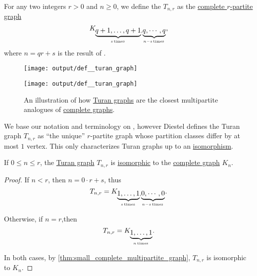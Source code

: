 \begin{definition}\label{def:turan_graph}\mimprovised
  For any two integers \( r > 0 \) and \( n \geq 0 \), we define the  \( T_{n,r} \) as the \hyperref[def:complete_multipartite_graph]{complete \( r \)-partite graph}
  \begin{equation*}
    K_{\underbrace{q+1,\ldots,q+1}_{s \T*{times}},\underbrace{q,\cdots,q}_{n - s \T*{times}}},
  \end{equation*}
  where \( n = qr + s \) is the result of .

  \begin{figure}[!ht]
    \begin{subcaptionblock}{0.45\textwidth}
      \centering
      \texttt{[image: output/def\_\_turan\_graph]}
      \caption{\( K_5 \)}\label{fig:def:turan_graph/k5}
    \end{subcaptionblock}
    \hfill
    \begin{subcaptionblock}{0.45\textwidth}
      \centering
      \texttt{[image: output/def\_\_turan\_graph]}
      \caption{\( T_{5,3} \)}\label{fig:def:turan_graph/t52}
    \end{subcaptionblock}
    \caption{An illustration of how \hyperref[def:turan_graph]{Turan graphs} are the closest multipartite analogues of \hyperref[def:complete_graph]{complete graphs}.}\label{fig:def:turan_graph}
  \end{figure}
\end{definition}
\begin{comments}
  \item We base our notation and terminology on \cite[175]{Diestel2017GraphTheory}, however Diestel defines the Turan graph \( T_{n,r} \) as \enquote{the unique} \( r \)-partite graph whose partition classes differ by at most \( 1 \) vertex. This only characterizes Turan graphs up to an \hyperref[thm:graph_isomorphisms/simple_undirected]{isomorphism}.
\end{comments}

\begin{proposition}\label{thm:small_turan_graph}
  If \( 0 \leq n \leq r \), the \hyperref[def:turan_graph]{Turan graph} \( T_{n,r} \) is \hyperref[def:undirected_graph/homomorphism]{isomorphic} to the \hyperref[def:complete_graph]{complete graph} \( K_n \).
\end{proposition}
\begin{proof}
  If \( n < r \), then \( n = 0 \cdot r + s \), thus
  \begin{equation*}
    T_{n,r} = K_{\underbrace{1,\ldots,1}_{s \T*{times}},\underbrace{0,\cdots,0}_{n - s \T*{times}}}.
  \end{equation*}

  Otherwise, if \( n = r \),then
  \begin{equation*}
    T_{n,r} = K_{\underbrace{1,\ldots,1}_{n \T*{times}}}.
  \end{equation*}

  In both cases, by \cref{thm:small_complete_multipartite_graph}, \( T_{n,r} \) is isomorphic to \( K_n \).
\end{proof}

